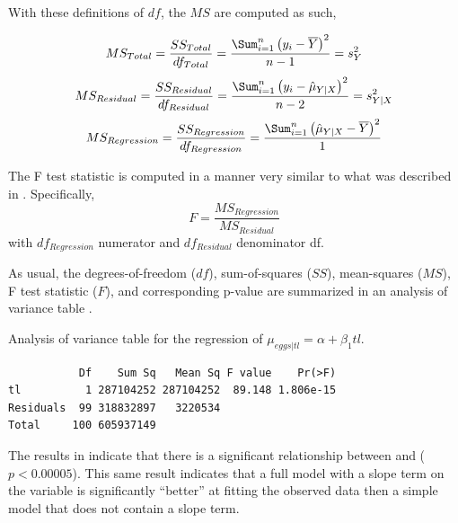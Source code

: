 \documentclass[10pt,openany]{book}\usepackage[]{graphicx}\usepackage[]{color}
\makeatletter
\newenvironment{kframe}{%
 \def\at@end@of@kframe{}%
 \ifinner\ifhmode%
  \def\at@end@of@kframe{\end{minipage}}%
  \begin{minipage}{\columnwidth}%
 \fi\fi%
 \def\FrameCommand##1{\hskip\@totalleftmargin \hskip-\fboxsep
 \colorbox{shadecolor}{##1}\hskip-\fboxsep
     \hskip-\linewidth \hskip-\@totalleftmargin \hskip\columnwidth}%
 \MakeFramed {\advance\hsize-\width
   \@totalleftmargin\z@ \linewidth\hsize
   \@setminipage}}%
 {\par\unskip\endMakeFramed%
 \at@end@of@kframe}
\newenvironment{knitrout}{}{} %
\makeatother
\begin{document}

With these definitions of $df$, the $MS$ are computed as such,

\begin{equation}\label{eqn:SLRsimpleMS}
  MS_{Total} = \frac{SS_{Total}}{df_{Total}} = \frac{\Sum_{i=1}^{n}\left(y_{i}-\overline{Y}\right)^{2}}{n-1} = s_{Y}^{2}
\end{equation}
\begin{equation}\label{eqn:SLRfullMS}
  MS_{Residual} = \frac{SS_{Residual}}{df_{Residual}} = \frac{\Sum_{i=1}^{n}\left(y_{i}-\hat{\mu}_{Y|X}\right)^{2}}{n-2} = s_{Y|X}^{2}
\end{equation}
\[ MS_{Regression} = \frac{SS_{Regression}}{df_{Regression}} = \frac{\Sum_{i=1}^{n}\left(\hat{\mu}_{Y|X}-\overline{Y}\right)^{2}}{1} \]

The F test statistic is computed in a manner very similar to what was described in .  Specifically,
\[ F = \frac{MS_{Regression}}{MS_{Residual}} \]
with $df_{Regression}$ numerator and $df_{Residual}$ denominator df.

As usual, the degrees-of-freedom ($df$), sum-of-squares ($SS$), mean-squares ($MS$), F test statistic ($F$), and corresponding p-value are summarized in an analysis of variance table .

\begin{table}[h]
  \centering
  \caption{Analysis of variance table for the regression of $\mu_{eggs|tl} = \alpha + \beta_{1}tl$.}\label{tab:SLRLTANOVA}
\begin{knitrout}
\color{fgcolor}\begin{kframe}
\begin{verbatim}
           Df    Sum Sq   Mean Sq F value    Pr(>F)
tl          1 287104252 287104252  89.148 1.806e-15
Residuals  99 318832897   3220534                  
Total     100 605937149                            
\end{verbatim}
\end{kframe}
\end{knitrout}
\end{table}


The results in  indicate that there is a significant relationship between  and  ($p<0.00005$).  This same result indicates that a full model with a slope term on the  variable is significantly ``better'' at fitting the observed data then a simple model that does not contain a slope term.
\end{document}
